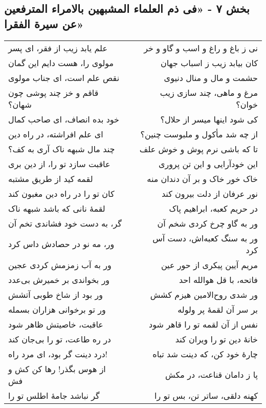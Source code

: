 \begin{center}
\section*{بخش ۷ - «فی ذم العلماء المشبهین بالامراء المترفعین عن سیرة الفقرا»}
\label{sec:007}
\begin{longtable}{l p{0.5cm} r}
علم یابد زیب از فقر، ای پسر
&&
نی ز باغ و راغ و اسب و گاو و خر
\\
مولوی را، هست دایم این گمان
&&
کان بیابد زیب ز اسباب جهان
\\
نقص علم است، ای جناب مولوی
&&
حشمت و مال و منال دنیوی
\\
قاقم و خز چند پوشی چون شهان؟
&&
مرغ و ماهی، چند سازی زیب خوان؟
\\
خود بده انصاف، ای صاحب کمال
&&
کی شود اینها میسر از حلال؟
\\
ای علم افراشته، در راه دین
&&
از چه شد مأکول و ملبوست چنین؟
\\
چند مال شبهه ناک آری به کف؟
&&
تا که باشی نرم پوش و خوش علف
\\
عاقبت سازد تو را، از دین بری
&&
این خودآرایی و این تن پروری
\\
لقمه کید از طریق مشتبه
&&
خاک خور خاک و بر آن دندان منه
\\
کان تو را در راه دین مغبون کند
&&
نور عرفان از دلت بیرون کند
\\
لقمهٔ نانی که باشد شبهه ناک
&&
در حریم کعبه، ابراهیم پاک
\\
گر، به دست خود فشاندی تخم آن
&&
ور به گاو چرخ کردی شخم آن
\\
ور، مه نو در حصادش داس کرد
&&
ور به سنگ کعبه‌اش، دست آس کرد
\\
ور به آب زمزمش کردی عجین
&&
مریم آیین پیکری از حور عین
\\
ور بخواندی بر خمیرش بی‌عدد
&&
فاتحه، با قل هوالله احد
\\
ور بود از شاخ طوبی آتشش
&&
ور شدی روح‌الامین هیزم کشش
\\
ور تو برخوانی هزاران بسمله
&&
بر سر آن لقمهٔ پر ولوله
\\
عاقبت، خاصیتش ظاهر شود
&&
نفس از آن لقمه تو را قاهر شود
\\
در ره طاعت، تو را بی‌جان کند
&&
خانهٔ دین تو را ویران کند
\\
درد دینت گر بود، ای مرد راه!
&&
چارهٔ خود کن، که دینت شد تباه
\\
از هوس بگذر! رها کن کش و فش
&&
پا ز دامان قناعت، در مکش
\\
گر نباشد جامهٔ اطلس تو را
&&
کهنه دلقی، ساتر تن، بس تو را

\end{longtable}
\end{center}
